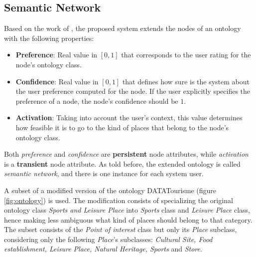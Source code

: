 \documentclass{article}
\begin{document}
\subsection{Semantic Network} \label{section:semantic_network}

Based on the work of \cite{bahramian_abbaspour_claramunt_2017}, the proposed system extends the nodes of an ontology with the following properties:
\begin{itemize}
    \item \textbf{Preference}: Real value in $[0, 1]$ that corresponds to the user rating for the node's ontology class.
    \item \textbf{Confidence}: Real value in $[0, 1]$ that defines how sure is the system about the user preference computed for the node. If the user explicitly specifies the preference of a node, the node's confidence should be $1$.
    \item \textbf{Activation}: Taking into account the user's context, this value determines how feasible it is to go to the kind of places that belong to the node's ontology class.
\end{itemize}{}
Both \textit{preference} and \textit{confidence} are \textbf{persistent} node attributes, while \textit{activation} is a \textbf{transient} node attribute. As told before, the extended ontology is called \textit{semantic network}, and there is one instance for each system user.

A subset of a modified version of the ontology DATATourisme (figure \ref{fig:ontology}) is used. The modification consists of specializing the original ontology class \textit{Sports and Leisure Place} into \textit{Sports} class and \textit{Leisure Place} class, hence making less ambiguous what kind of places should belong to that category. The subset consists of the \textit{Point of interest} class but only its \textit{Place} subclass, considering only the following \textit{Place}'s subclasses: \textit{Cultural Site, Food establishment, Leisure Place, Natural Heritage, Sports} and \textit{Store}. 
\end{document}

